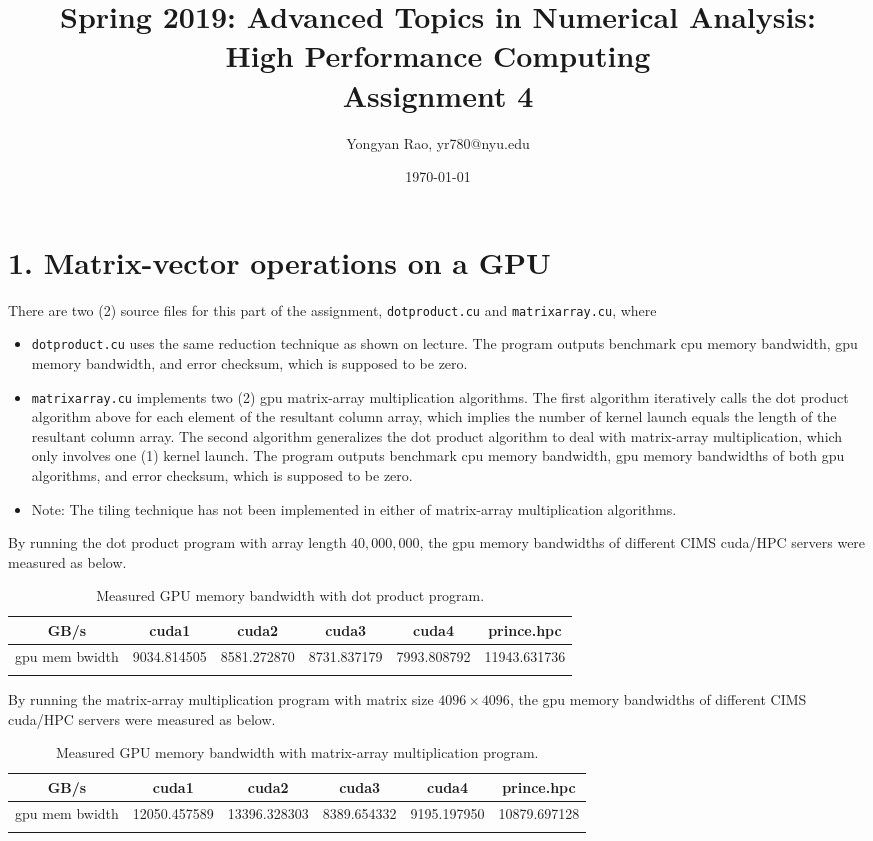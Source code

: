 \documentclass[amsmath,amssymb]{revtex4}
\begin{document}
\title{Spring 2019: Advanced Topics in Numerical Analysis:\\
High Performance Computing\\
Assignment 4}
\author{Yongyan Rao, yr780@nyu.edu}
\date{\today}
\maketitle


\section{\label{sec:sec1}1. Matrix-vector operations on a GPU}
There are two (2) source files for this part of the assignment, {\tt dotproduct.cu} and {\tt matrixarray.cu}, where
\begin{itemize}
\item {\tt dotproduct.cu} uses the same reduction technique as shown on lecture. The program outputs benchmark cpu memory bandwidth, gpu memory bandwidth, and error checksum, which is supposed to be zero.
\item {\tt matrixarray.cu} implements two (2) gpu matrix-array multiplication algorithms. The first algorithm iteratively calls the dot product algorithm above for each element of the resultant column array, which implies the number of kernel launch equals the length of the resultant column array. The second algorithm generalizes the dot product algorithm to deal with matrix-array multiplication, which only involves one (1) kernel launch. The program outputs benchmark cpu memory bandwidth, gpu memory bandwidths of both gpu algorithms, and error checksum, which is supposed to be zero.
\item Note: The tiling technique has not been implemented in either of matrix-array multiplication algorithms.
\end{itemize}
By running the dot product program with array length $40,000,000$, the gpu memory bandwidths of different CIMS cuda/HPC servers were measured as below.
\begin{longtable}{c | c | c | c | c | c }
    \hline 
GB/s & cuda1 & cuda2 & cuda3 & cuda4 & prince.hpc \\ \hline \hline
gpu mem bwidth&9034.814505	&8581.272870  &	8731.837179 & 7993.808792 & 11943.631736 \\\hline
\caption{Measured GPU memory bandwidth with dot product program.}
\end{longtable}
By running the matrix-array multiplication program with matrix size $4096\times4096$, the gpu memory bandwidths of different CIMS cuda/HPC servers were measured as below.
\begin{longtable}{c | c | c | c | c | c }
    \hline 
GB/s & cuda1 & cuda2 & cuda3 & cuda4 & prince.hpc \\ \hline \hline
gpu mem bwidth&12050.457589&13396.328303  &	8389.654332 & 9195.197950  & 10879.697128 \\\hline
\caption{Measured GPU memory bandwidth with matrix-array multiplication program.}
\end{longtable}
\end{document}
